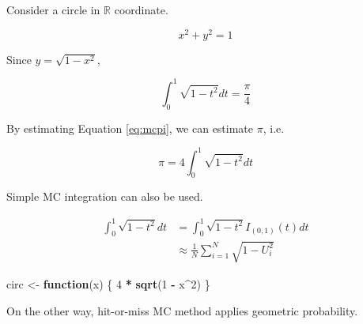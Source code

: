 \documentclass[]{book}
\newenvironment{Shaded}{\begin{snugshade}}{\end{snugshade}}
\newcommand{\CommentTok}[1]{\textcolor[rgb]{0.56,0.35,0.01}{\textit{#1}}}
\newcommand{\ControlFlowTok}[1]{\textcolor[rgb]{0.13,0.29,0.53}{\textbf{#1}}}
\newcommand{\DataTypeTok}[1]{\textcolor[rgb]{0.13,0.29,0.53}{#1}}
\newcommand{\DecValTok}[1]{\textcolor[rgb]{0.00,0.00,0.81}{#1}}
\newcommand{\KeywordTok}[1]{\textcolor[rgb]{0.13,0.29,0.53}{\textbf{#1}}}
\newcommand{\NormalTok}[1]{#1}
\newcommand{\OperatorTok}[1]{\textcolor[rgb]{0.81,0.36,0.00}{\textbf{#1}}}
\newcommand{\StringTok}[1]{\textcolor[rgb]{0.31,0.60,0.02}{#1}}
\theoremstyle{definition}
\theoremstyle{definition}
\theoremstyle{definition}
\theoremstyle{remark}
\let\BeginKnitrBlock\begin \let\EndKnitrBlock\end
\begin{document}
\BeginKnitrBlock{example}[Estimation of $\pi$]
\protect\hypertarget{exm:estpi}{}{\label{exm:estpi} {} }Consider a circle in \(\mathbb{R}\) coordinate.

\[x^2 + y^2 = 1\]

Since \(y = \sqrt{1 - x^2}\),

\begin{equation}
  \int_0^1 \sqrt{1 - t^2} dt = \frac{\pi}{4}
  \label{eq:mcpi}
\end{equation}
\EndKnitrBlock{example}

By estimating Equation \eqref{eq:mcpi}, we can estimate \(\pi\), i.e.

\[\pi = 4 \int_0^1 \sqrt{1 - t^2} dt\]

Simple MC integration can also be used.

\begin{equation*}
  \begin{split}
    \int_0^1 \sqrt{1 - t^2} dt & = \int_0^1 \sqrt{1 - t^2} I_{(0,1)}(t) dt \\
    & \approx \frac{1}{N} \sum_{i = 1}^N \sqrt{1 - U_i^2}
  \end{split}
\end{equation*}

\begin{Shaded}
\begin{Highlighting}[]
\NormalTok{circ <-}\StringTok{ }\ControlFlowTok{function}\NormalTok{(x) \{}
  \DecValTok{4} \OperatorTok{*}\StringTok{ }\KeywordTok{sqrt}\NormalTok{(}\DecValTok{1} \OperatorTok{-}\StringTok{ }\NormalTok{x}\OperatorTok{^}\DecValTok{2}\NormalTok{)}
\NormalTok{\}}
\end{Highlighting}
\end{Shaded}

\begin{Shaded}
\end{Shaded}

On the other way, hit-or-miss MC method applies geometric probability.
\end{document}
